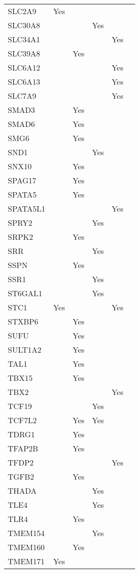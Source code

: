 \documentclass[]{report}
\begin{document}
\begin{longtable}[t]{llllll}
SLC2A9 & Yes &  &  &  & \\
SLC30A8 &  &  & Yes &  & \\
SLC34A1 &  &  &  & Yes & \\
SLC39A8 &  & Yes &  &  & \\
SLC6A12 &  &  &  & Yes & \\
SLC6A13 &  &  &  & Yes & \\
SLC7A9 &  &  &  & Yes & \\
SMAD3 &  & Yes &  &  & \\
SMAD6 &  & Yes &  &  & \\
SMG6 &  & Yes &  &  & \\
SND1 &  &  & Yes &  & \\
SNX10 &  & Yes &  &  & \\
SPAG17 &  & Yes &  &  & \\
SPATA5 &  & Yes &  &  & \\
SPATA5L1 &  &  &  & Yes & \\
SPRY2 &  &  & Yes &  & \\
SRPK2 &  & Yes &  &  & \\
SRR &  &  & Yes &  & \\
SSPN &  & Yes &  &  & \\
SSR1 &  &  & Yes &  & \\
ST6GAL1 &  &  & Yes &  & \\
STC1 & Yes &  &  & Yes & \\
STXBP6 &  & Yes &  &  & \\
SUFU &  & Yes &  &  & \\
SULT1A2 &  & Yes &  &  & \\
TAL1 &  & Yes &  &  & \\
TBX15 &  & Yes &  &  & \\
TBX2 &  &  &  & Yes & \\
TCF19 &  &  & Yes &  & \\
TCF7L2 &  & Yes & Yes &  & \\
TDRG1 &  & Yes &  &  & \\
TFAP2B &  & Yes &  &  & \\
TFDP2 &  &  &  & Yes & \\
TGFB2 &  & Yes &  &  & \\
THADA &  &  & Yes &  & \\
TLE4 &  &  & Yes &  & \\
TLR4 &  & Yes &  &  & \\
TMEM154 &  &  & Yes &  & \\
TMEM160 &  & Yes &  &  & \\
TMEM171 & Yes &  &  &  & \\

\end{longtable}
\end{document}
